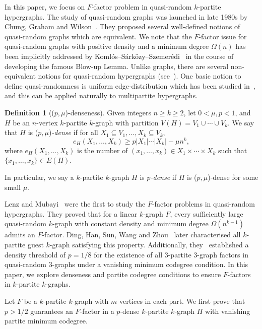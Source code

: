 \documentclass[11pt,a4paper]{article}
\theoremstyle{definition}
\newtheorem{defi}[thm]{Definition}
\begin{document}
In this paper, we focus on $F$-factor problem in quasi-random $k$-partite hypergraphs. 
The study of quasi-random graphs was launched in late 1980s by Chung, Graham and Wilson~\cite{Chung-quasi-random}. They proposed several well-defined notions of quasi-random graphs which are equivalent. We note that the $F$-factor issue for quasi-random graphs with positive density and a minimum degree $\Omega(n)$ has been implicitly addressed by Koml\'{o}s--S\'{a}rk\"{o}zy--Szemer\'{e}di~\cite{Koml1997Blow} in the course of developing the famous Blow-up Lemma. Unlike graphs, there are several non-equivalent notions for quasi-random hypergraphs (see~\cite{Reiher_2017}).
One basic notion to define quasi-randomness is uniform edge-distribution which has been studied in~\cite{RRS, LenM}, and this can be applied naturally to multipartite hypergraphs.

\begin{defi}[($p,\mu $){-denseness}] \label{def.}
Given integers $n\geq k\geq2$, let $0<\mu,p <1$, and $H$ be an $n$-vertex $k$-partite $k$-graph with partition $V(H)=V_1\cup \cdots \cup V_k$. We say that $H$ is ($p,\mu $)\emph{-dense} if for all $X_1\subseteq V_1, \dots ,X_k\subseteq V_k$,
\begin{equation}\label{eq:count}
e_H(X_1,\dots,X_k)\geq p|X_1|\cdots|X_k|-\mu n^k,
\end{equation}
where $e_{H}(X_1,\dots,X_k)$ is the number of $(x_1,\dots,x_k)\in X_1\times \cdots \times X_k$ such that $\{x_1,\dots,x_k\}\in E(H)$.
\end{defi}

In particular, we say a $k$-partite $k$-graph $H$ is \emph{$p$-dense} if $H$ is ($p,\mu $)-dense for some small $\mu$.



Lenz and Mubayi~\cite{LenM} were the first to study the $F$-factor problems in quasi-random hypergraphs. They proved that for a linear $k$-graph $F$, every sufficiently large quasi-random $k$-graph with constant density and minimum degree $\Omega(n^{k-1})$ admits an $F$-factor. Ding, Han, Sun, Wang and Zhou~\cite{DHSWZ22} later characterised all $k$-partite guest $k$-graph satisfying this property. Additionally, they~\cite{DHSWZ} established a density threshold of $p=1/8$ for the existence of all $3$-partite $3$-graph factors in quasi-random $3$-graphs under a vanishing minimum codegree condition. In this paper, we explore denseness and partite codegree conditions to ensure $F$-factors in $k$-partite $k$-graphs.

Let $F$ be a $k$-partite $k$-graph with $m$ vertices in each part. We first prove that $p > 1/2$ guarantees an $F$-factor in a $p$-dense $k$-partite $k$-graph $H$ with vanishing partite minimum codegree.
\end{document}
